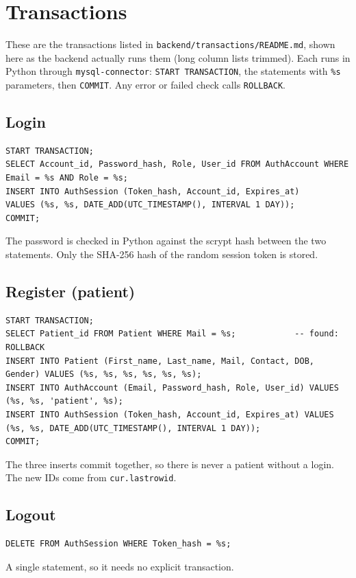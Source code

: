\documentclass[11pt,a4paper]{article}
\newcommand{\code}[1]{\texttt{#1}}
\begin{document}
\section{Transactions}

These are the transactions listed in \code{backend/transactions/README.md}, shown here as the backend actually runs them (long column lists trimmed). Each runs in Python through \code{mysql-connector}: \code{START TRANSACTION}, the statements with \code{\%s} parameters, then \code{COMMIT}. Any error or failed check calls \code{ROLLBACK}.

\subsection*{Login}
\begin{lstlisting}[style=sql]
START TRANSACTION;
SELECT Account_id, Password_hash, Role, User_id FROM AuthAccount WHERE Email = %s AND Role = %s;
INSERT INTO AuthSession (Token_hash, Account_id, Expires_at)
VALUES (%s, %s, DATE_ADD(UTC_TIMESTAMP(), INTERVAL 1 DAY));
COMMIT;
\end{lstlisting}
The password is checked in Python against the scrypt hash between the two statements. Only the SHA-256 hash of the random session token is stored.

\subsection*{Register (patient)}
\begin{lstlisting}[style=sql]
START TRANSACTION;
SELECT Patient_id FROM Patient WHERE Mail = %s;            -- found: ROLLBACK
INSERT INTO Patient (First_name, Last_name, Mail, Contact, DOB, Gender) VALUES (%s, %s, %s, %s, %s, %s);
INSERT INTO AuthAccount (Email, Password_hash, Role, User_id) VALUES (%s, %s, 'patient', %s);
INSERT INTO AuthSession (Token_hash, Account_id, Expires_at) VALUES (%s, %s, DATE_ADD(UTC_TIMESTAMP(), INTERVAL 1 DAY));
COMMIT;
\end{lstlisting}
The three inserts commit together, so there is never a patient without a login. The new IDs come from \code{cur.lastrowid}.

\subsection*{Logout}
\begin{lstlisting}[style=sql]
DELETE FROM AuthSession WHERE Token_hash = %s;
\end{lstlisting}
A single statement, so it needs no explicit transaction.
\end{document}
